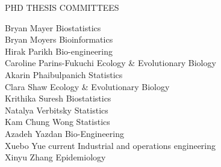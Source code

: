 \begin{mylist}{PHD THESIS COMMITTEES}
\begin{tabbing}
Bryan Mayer  \> Biostatistics\\
Bryan Moyers \> Bioinformatics\\
Hirak Parikh  \> Bio-engineering\\
Caroline Parins-Fukuchi  \> Ecology \& Evolutionary Biology\\
Akarin Phaibulpanich  \> Statistics\\
Clara Shaw \> Ecology \& Evolutionary Biology\\
Krithika Suresh  \> Biostatistics\\
Natalya Verbitsky  \> Statistics\\
Kam Chung Wong  \> Statistics\\
Azadeh Yazdan  \> Bio-Engineering\\
Xuebo Yue \> current \> Industrial and operations engineering\\
Xinyu Zhang  \> Epidemiology \\
\end{tabbing}


\end{mylist}

